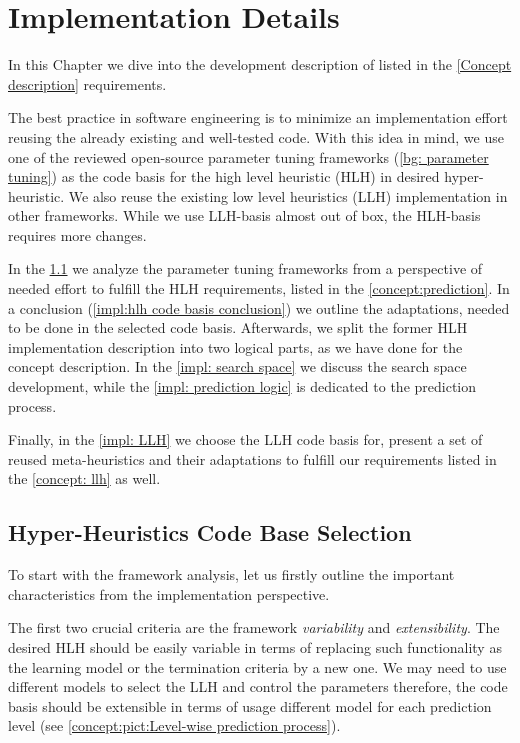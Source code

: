 \chapter{Implementation Details}
In this Chapter we dive into the development description of listed in the \cref{Concept description} requirements.
 
The best practice in software engineering is to minimize an implementation effort reusing the already existing and well-tested code. With this idea in mind, we use one of the reviewed open-source parameter tuning frameworks (\cref{bg: parameter tuning}) as the code basis for the high level heuristic (HLH) in desired hyper-heuristic. We also reuse the existing low level heuristics (LLH) implementation in other frameworks. While we use LLH-basis almost out of box, the HLH-basis requires more changes.

In the \cref{impl:hlh code basis section} we analyze the parameter tuning frameworks from a perspective of needed effort to fulfill the HLH requirements, listed in the \cref{concept:prediction}. In a conclusion (\cref{impl:hlh code basis conclusion}) we outline the adaptations, needed to be done in the selected code basis. Afterwards, we split the former HLH implementation description into two logical parts, as we have done for the concept description. In the \cref{impl: search space} we discuss the search space development, while the \ref{impl: prediction logic} is dedicated to the prediction process.

Finally, in the \cref{impl: LLH} we choose the LLH code basis for, present a set of reused meta-heuristics and their adaptations to fulfill our requirements listed in the \cref{concept: llh} as well.


\section{Hyper-Heuristics Code Base Selection}\label{impl:hlh code basis section}
To start with the framework analysis, let us firstly outline the important characteristics from the implementation perspective.

The first two crucial criteria are the framework \emph{variability} and \emph{extensibility}. The desired HLH should be easily variable in terms of replacing such functionality as the learning model or the termination criteria by a new one. We may need to use different models to select the LLH and control the parameters therefore, the code basis should be extensible in terms of usage different model for each prediction level (see \cref{concept:pict:Level-wise prediction process}).

